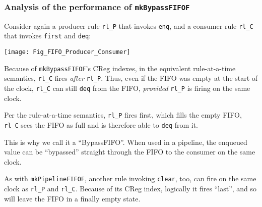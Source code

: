 \begin{frame}[fragile]
\frametitle{Analysis of the performance of {\tt mkBypassFIFOF}}

\footnotesize

\begin{minipage}{0.45\textwidth}
  Consider again a producer rule \verb|rl_P| that invokes \verb|enq|, and a
  consumer rule \verb|rl_C| that invokes \verb|first| and \verb|deq|:
\end{minipage}
\hm
\begin{minipage}{0.5\textwidth}
  \texttt{[image: Fig\_FIFO\_Producer\_Consumer]}
\end{minipage}

\vspace{5ex}

Because of {\tt mkBypassFIFOF}'s CReg indexes, in the equivalent
rule-at-a-time semantics, \verb|rl_C| fires \emph{after} \verb|rl_P|.
Thus, even if the FIFO was empty at the start of the clock, \verb|rl_C|
can still \verb|deq| from the FIFO, \emph{provided} \verb|rl_P| is
firing on the same clock.

\vspace{1ex}

Per the rule-at-a-time semantics, \verb|rl_P| fires first, which fills
the empty FIFO, {\ie} \verb|rl_C| sees the FIFO as full and is
therefore able to \verb|deq| from it.

\vspace{1ex}

This is why we call it a ``BypassFIFO''.  When used in a pipeline, the
enqueued value can be ``bypassed'' straight through the FIFO to the
consumer on the same clock.

\vspace{2ex}

As with {\tt mkPipelineFIFOF}, another rule invoking \verb|clear|,
too, can fire on the same clock as \verb|rl_P| and \verb|rl_C|.
Because of its CReg index, logically it fires ``last'', and so will
leave the FIFO in a finally empty state.

\end{frame}


